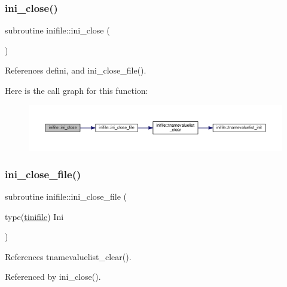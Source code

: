 \subsubsection{\texorpdfstring{ini\+\_\+close()}{ini\_close()}}
{\footnotesize\ttfamily subroutine inifile\+::ini\+\_\+close (\begin{DoxyParamCaption}{ }\end{DoxyParamCaption})}



References defini, and ini\+\_\+close\+\_\+file().

Here is the call graph for this function\+:
\nopagebreak
\begin{figure}[H]
\begin{center}
\leavevmode
\includegraphics[width=350pt]{namespaceinifile_a78d82ad0d3252c4a2d546ee63b37b9b4_cgraph}
\end{center}
\end{figure}
\mbox{\label{namespaceinifile_a3e8c87d124e33f36146deccd416a2cc1}} 
\subsubsection{\texorpdfstring{ini\+\_\+close\+\_\+file()}{ini\_close\_file()}}
{\footnotesize\ttfamily subroutine inifile\+::ini\+\_\+close\+\_\+file (\begin{DoxyParamCaption}\item[{type(\mbox{\hyperlink{structinifile_1_1tinifile}{tinifile}})}]{Ini }\end{DoxyParamCaption})}



References tnamevaluelist\+\_\+clear().



Referenced by ini\+\_\+close().

